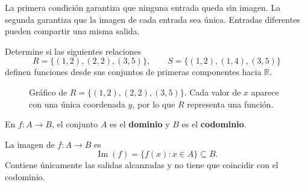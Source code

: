 \documentclass[10pt,a5paper]{article}
\newif\ifmostrarSoluciones
\begin{document}
La primera condición garantiza que ninguna entrada queda sin imagen. La segunda garantiza que la imagen de cada entrada sea única. Entradas diferentes pueden compartir una misma salida.

\begin{ejemplo}
Determine si las siguientes relaciones 
\[
R=\{(1,2),(2,2),(3,5)\},\qquad
S=\{(1,2),(1,4),(3,5)\}
\]
definen funciones desde sus conjuntos de primeras componentes hacia $\mathbb{R}$.
\end{ejemplo}
\ifmostrarSoluciones
\begin{solucion}
$R$ sí es función: cada entrada $1,2,3$ aparece asociada con una única salida. Que $1$ y $2$ compartan la salida $2$ no viola la definición. $S$ no es función porque la entrada $1$ posee dos salidas distintas.
\end{solucion}
\else\vspace{12mm}\fi

\begin{figure}[H]
\centering
{}
\caption{Gráfico de $R=\{(1,2),(2,2),(3,5)\}$. Cada valor de $x$ aparece con una única coordenada $y$, por lo que $R$ representa una función.}
\label{fig:pares-ordenados-funcion}
\end{figure}

\begin{definicion}
En $f:A\to B$, el conjunto $A$ es el \textbf{dominio} y $B$ es el \textbf{codominio}.
\end{definicion}

\begin{definicion}
La imagen de $f:A\to B$ es
\[
\operatorname{Im}(f)=\{f(x):x\in A\}\subseteq B.
\]
Contiene únicamente las salidas alcanzadas y no tiene que coincidir con el codominio.
\end{definicion}
\end{document}
